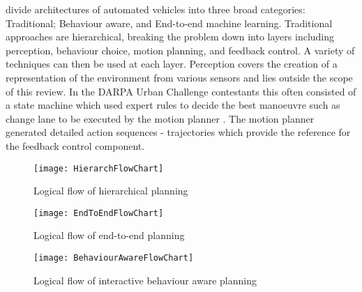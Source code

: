 \cite{Schwarting2018} divide architectures of automated vehicles into three broad categories: Traditional; Behaviour aware, and End-to-end machine learning. Traditional approaches are hierarchical, breaking the problem down into layers including perception, behaviour choice, motion planning, and feedback control. A variety of techniques can then be used at each layer. Perception covers the creation of a representation of the environment from various sensors and lies outside the scope of this review. In the DARPA Urban Challenge contestants this often consisted of a state machine which used expert rules to decide the best manoeuvre such as change lane to be executed by the motion planner \cite{Urmson2008}. The motion planner generated detailed action sequences - trajectories which provide the reference for the feedback control component. 



\begin{figure}[ht]
  \begin{center}
	\texttt{[image: HierarchFlowChart]}
	\caption{Logical flow of hierarchical planning}
	\label{fig:hierarch_flow}
  \end{center}
\end{figure}
\begin{figure}[ht]
  \begin{center}
	\texttt{[image: EndToEndFlowChart]}
	\caption{Logical flow of end-to-end planning}
	\label{fig:endtoend_flow}
  \end{center}
\end{figure}
\begin{figure}[ht]
  \begin{center}
	\texttt{[image: BehaviourAwareFlowChart]}
	\caption{Logical flow of interactive behaviour aware planning}
	\label{fig:behaviour_aware_flow}
  \end{center}
\end{figure}

